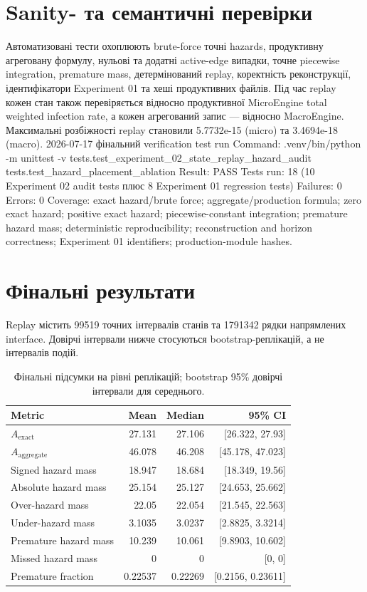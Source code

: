 \documentclass[11pt]{article}
\begin{document}
\section{Sanity- та семантичні перевірки}
Автоматизовані тести охоплюють brute-force точні hazards, продуктивну агреговану формулу, нульові та додатні active-edge випадки, точне piecewise integration, premature mass, детермінований replay, коректність реконструкції, ідентифікатори Experiment 01 та хеші продуктивних файлів. Під час replay кожен стан також перевіряється відносно продуктивної MicroEngine total weighted infection rate, а кожен агрегований запис --- відносно MacroEngine. Максимальні розбіжності replay становили 5.7732e-15 (micro) та 3.4694e-18 (macro). 2026-07-17 фінальний verification test run
Command: .venv/bin/python -m unittest -v tests.test\_experiment\_02\_state\_replay\_hazard\_audit tests.test\_hazard\_placement\_ablation
Result: PASS
Tests run: 18 (10 Experiment 02 audit tests плюс 8 Experiment 01 regression tests)
Failures: 0
Errors: 0
Coverage: exact hazard/brute force; aggregate/production formula; zero exact hazard; positive exact hazard; piecewise-constant integration; premature hazard mass; deterministic reproducibility; reconstruction and horizon correctness; Experiment 01 identifiers; production-module hashes.

\section{Фінальні результати}
Replay містить 99519 точних інтервалів станів та 1791342 рядки напрямлених interface. Довірчі інтервали нижче стосуються bootstrap-реплікацій, а не інтервалів подій.
\begin{table}[H]\centering
\caption{Фінальні підсумки на рівні реплікацій; bootstrap 95\% довірчі інтервали для середнього.}
\begin{tabular}{lrrr}\toprule
Metric & Mean & Median & 95\% CI \\\midrule
$A_{\mathrm{exact}}$ & 27.131 & 27.106 & [26.322, 27.93] \\
$A_{\mathrm{aggregate}}$ & 46.078 & 46.208 & [45.178, 47.023] \\
Signed hazard mass & 18.947 & 18.684 & [18.349, 19.56] \\
Absolute hazard mass & 25.154 & 25.127 & [24.653, 25.662] \\
Over-hazard mass & 22.05 & 22.054 & [21.545, 22.563] \\
Under-hazard mass & 3.1035 & 3.0237 & [2.8825, 3.3214] \\
Premature hazard mass & 10.239 & 10.061 & [9.8903, 10.602] \\
Missed hazard mass & 0 & 0 & [0, 0] \\
Premature fraction & 0.22537 & 0.22269 & [0.2156, 0.23611] \\
\bottomrule\end{tabular}\end{table}
\end{document}
